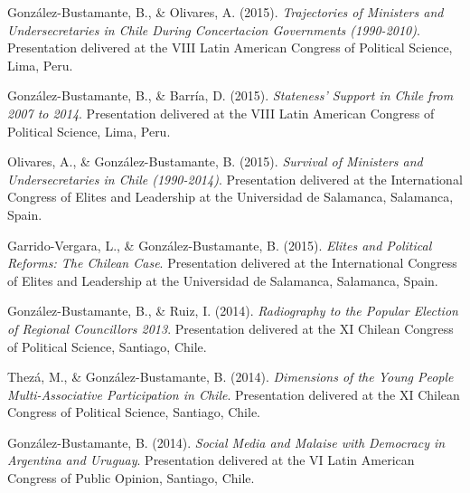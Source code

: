 \begin{publications}
\begin{benumerate}{66}
\item{\small González-Bustamante, B., \& Olivares, A. (2015). {\itshape Trajectories of Ministers and Undersecretaries in Chile During Concertacion Governments (1990-2010)}. Presentation delivered at the VIII Latin American Congress of Political Science, Lima, Peru.}\vspace{1mm}

\item{\small González-Bustamante, B., \& Barría, D. (2015). {\itshape Stateness' Support in Chile from 2007 to 2014}. Presentation delivered at the VIII Latin American Congress of Political Science, Lima, Peru.}\vspace{1mm}

\item{\small Olivares, A., \& González-Bustamante, B. (2015). {\itshape Survival of Ministers and Undersecretaries in Chile (1990-2014)}. Presentation delivered at the International Congress of Elites and Leadership at the Universidad  de Salamanca, Salamanca, Spain.}\vspace{1mm}

\item{\small Garrido-Vergara, L., \& González-Bustamante, B. (2015). {\itshape Elites and Political Reforms: The Chilean Case}. Presentation delivered at the International Congress of Elites and Leadership at the Universidad  de Salamanca, Salamanca, Spain.}\vspace{1mm}

\item{\small González-Bustamante, B., \& Ruiz, I. (2014). {\itshape Radiography to the Popular Election of Regional Councillors 2013}. Presentation delivered at the XI Chilean Congress of Political Science, Santiago, Chile.}\vspace{1mm}

\item{\small Thezá, M., \& González-Bustamante, B. (2014). {\itshape Dimensions of the Young People Multi-Associative Participation in Chile}. Presentation delivered at the XI Chilean Congress of Political Science, Santiago, Chile.}\vspace{1mm}

\item{\small González-Bustamante, B. (2014). {\itshape Social Media and Malaise with Democracy in Argentina and Uruguay}. Presentation delivered at the VI Latin American Congress of Public Opinion, Santiago, Chile.}\vspace{1mm}


\end{benumerate}
\end{publications}
